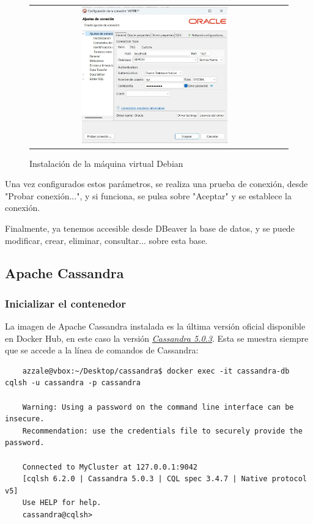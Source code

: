 \documentclass{article}
\begin{document}
\begin{figure}[H]
    \centering
    \begin{tabular}{c c}  %
    \includegraphics[width=0.6\textwidth]{configuracion_ajustes_conexion_oracle.png}
    \end{tabular}
    \caption{Instalación de la máquina virtual Debian}
    \label{fig:Configuración DBeaver de Oracle}
\end{figure}

Una vez configurados estos parámetros, se realiza una prueba de conexión, desde "Probar conexión...", y si funciona, se pulsa sobre "Aceptar" y se establece la conexión. 

Finalmente, ya tenemos accesible desde DBeaver la base de datos, y se puede modificar, crear, eliminar, consultar... sobre esta base. 

\subsection{Apache Cassandra}\label{subsec:Apache Cassandra}

\subsubsection{Inicializar el contenedor}
La imagen de Apache Cassandra instalada es la última versión oficial disponible en Docker Hub, en este caso la versión
\textit{\textcolor{blue}{\href{https://github.com/docker-library/cassandra/blob/105daf8445a12fc96ef48a1314566e0f61f473b2/5.0/Dockerfile}{Cassandra 5.0.3}}}. Esta se muestra siempre que se accede a la línea de comandos de Cassandra:

\begin{tcolorbox}[colback=black, coltext=white, fontupper=\ttfamily, title=Terminal]
\begin{verbatim}
    azzale@vbox:~/Desktop/cassandra$ docker exec -it cassandra-db cqlsh -u cassandra -p cassandra 

    Warning: Using a password on the command line interface can be insecure.
    Recommendation: use the credentials file to securely provide the password.

    Connected to MyCluster at 127.0.0.1:9042
    [cqlsh 6.2.0 | Cassandra 5.0.3 | CQL spec 3.4.7 | Native protocol v5]
    Use HELP for help.
    cassandra@cqlsh> 
\end{verbatim}
\end{tcolorbox}
\end{document}
